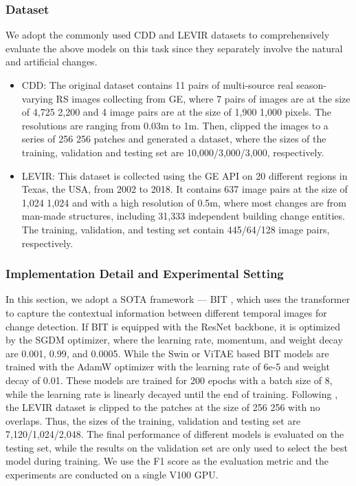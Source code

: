 \documentclass[10pt, journal,twoside]{IEEEtran}
\begin{document}
\subsubsection{Dataset}

We adopt the commonly used CDD \cite{cdd} and LEVIR \cite{levir} datasets to comprehensively evaluate the above models on this task since they separately involve the natural and artificial changes.

\begin{itemize}
  \item CDD: The original dataset contains 11 pairs of multi-source real season-varying RS images collecting from GE, where 7 pairs of images are at the size of 4,725  2,200 and 4 image pairs are at the size of 1,900  1,000 pixels. The resolutions are ranging from 0.03m to 1m. Then, \cite{cdd_clip} clipped the images to a series of 256  256 patches and generated a dataset, where the sizes of the training, validation and testing set are 10,000/3,000/3,000, respectively.
  \item LEVIR: This dataset is collected using the GE API on 20 different regions in Texas, the USA, from 2002 to 2018. It contains 637 image pairs at the size of 1,024  1,024 and with a high resolution of 0.5m, where most changes are from man-made structures, including 31,333 independent building change entities. The training, validation, and testing set contain 445/64/128 image pairs, respectively.

\end{itemize}

\subsubsection{Implementation Detail and Experimental Setting}

In this section, we adopt a SOTA framework --- BIT \cite{acd_2021_tgrs_bit}, which uses the transformer to capture the contextual information between different temporal images for change detection. If BIT is equipped with the ResNet backbone, it is optimized by the SGDM optimizer, where the learning rate, momentum, and weight decay are 0.001, 0.99, and 0.0005. While the Swin or ViTAE based BIT models are trained with the AdamW optimizer with the learning rate of 6e-5 and weight decay of 0.01. These models are trained for 200 epochs with a batch size of 8, while the learning rate is linearly decayed until the end of training. Following \cite{acd_2021_tgrs_bit}, the LEVIR dataset is clipped to the patches at the size of 256  256 with no overlaps. Thus, the sizes of the training, validation and testing set are 7,120/1,024/2,048. The final performance of different models is evaluated on the testing set, while the results on the validation set are only used to select the best model during training. We use the F1 score as the evaluation metric and the experiments are conducted on a single V100 GPU.
\end{document}
